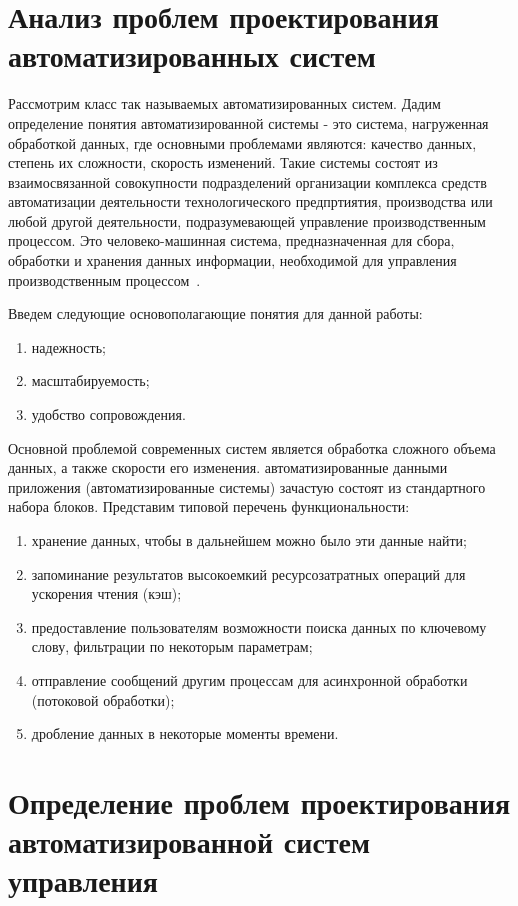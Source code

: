 \section{Анализ проблем проектирования автоматизированных систем}\label{sec:ch1/sec3}
Рассмотрим класс так называемых автоматизированных   систем. Дадим определение понятия автоматизированной системы - это система, нагруженная обработкой данных, где основными проблемами являются: качество данных, степень их сложности, скорость изменений. Такие системы состоят из взаимосвязанной совокупности подразделений организации комплекса средств автоматизации деятельности технологического предпртиятия, производства или любой другой деятельности, подразумевающей управление производственным процессом. Это человеко-машинная система, предназначенная для сбора, обработки и хранения данных информации, необходимой для управления производственным процессом~\cite{Ref1, Ref2, Ref3, Ref4,Ref5,Ref6,Ref7, Ref8, Ref9, Ref10,Ref11,Ref12}.

Введем следующие основополагающие понятия для данной работы:
\begin{enumerate}
    \item  надежность;
    \item  масштабируемость;
    \item  удобство сопровождения.
\end{enumerate}


Основной проблемой современных систем является обработка сложного объема данных, а также скорости его изменения. автоматизированные данными приложения (автоматизированные системы) зачастую состоят из стандартного набора блоков. Представим типовой перечень функциональности:
\begin{enumerate}
    \item  хранение данных, чтобы в дальнейшем можно было эти данные найти;
    \item  запоминание результатов высокоемкий ресурсозатратных операций для ускорения чтения (кэш);
    \item  предоставление пользователям возможности поиска данных по ключевому слову, фильтрации по некоторым параметрам;
    \item  отправление сообщений другим процессам для асинхронной обработки (потоковой обработки);
    \item  дробление данных в некоторые моменты времени.
\end{enumerate}



\section{Определение проблем проектирования автоматизированной систем управления}\label{sec:ch1/sec4}

